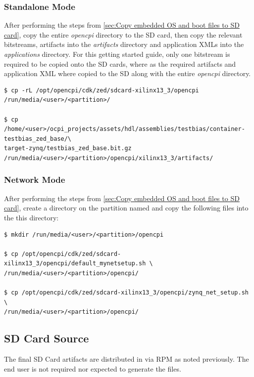 \subsubsection{Standalone Mode}
After performing the steps from \ref{sec:Copy embedded OS and boot files to SD card}, copy the entire \textit{opencpi} directory to the SD card, then copy the relevant bitstreams, artifacts into the \textit{artifacts} directory and application XMLs into the \textit{applications} directory. For this getting started guide, only one bitstream is required to be copied onto the SD cards, where as the required artifacts and application XML where copied to the SD along with the entire \textit{opencpi} directory.

\begin{verbatim}
$ cp -rL /opt/opencpi/cdk/zed/sdcard-xilinx13_3/opencpi /run/media/<user>/<partition>/

$ cp /home/<user>/ocpi_projects/assets/hdl/assemblies/testbias/container-testbias_zed_base/\
target-zynq/testbias_zed_base.bit.gz /run/media/<user>/<partition>/opencpi/xilinx13_3/artifacts/
\end{verbatim}

\subsubsection{Network Mode}
After performing the steps from \ref{sec:Copy embedded OS and boot files to SD card}, create a directory on the partition named  and copy the following files into the this directory:

\begin{verbatim}
$ mkdir /run/media/<user>/<partition>/opencpi

$ cp /opt/opencpi/cdk/zed/sdcard-xilinx13_3/opencpi/default_mynetsetup.sh \
/run/media/<user>/<partition>/opencpi/

$ cp /opt/opencpi/cdk/zed/sdcard-xilinx13_3/opencpi/zynq_net_setup.sh \
/run/media/<user>/<partition>/opencpi/
\end{verbatim}

\subsection{SD Card Source}
The final SD Card artifacts are distributed in  via RPM as noted previously. The end user is not required nor expected to generate the files.

\pagebreak
